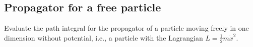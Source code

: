 \newcommand{\Z}{\mathbb{Z}}
\newcommand{\R}{\mathbb{R}}
\newcommand{\half}{\frac{1}{2}}
\newcommand{\ihbar}{\frac{i}{\hbar}}

\newcommand{\xcl}{x_{\text{cl}}}
\newcommand{\xd}{\delta{x}}
\newcommand{\dxd}[1]{\text{d}\xd_{#1}}

\newcommand{\tp}{t^\prime}
\newcommand{\dtp}{\text{d}\tp}

\newcommand{\del}[2][]{\frac{\partial{#1}}{\partial{#2}}}
\newcommand{\delsq}[2][]{\frac{\partial^2{#1}}{\partial{#2}^2}}

\newcommand{\func}[2]{#1\left[{#2}\right]}
\newcommand{\propagator}{K(x_f, x_0, t)}

\subsection{Propagator for a free particle}

Evaluate the path integral for the propagator of a particle moving freely in
one dimension without potential, i.e., a particle with the Lagrangian $L =
  \half m \dot{x}^2$.

